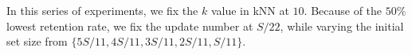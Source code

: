  In this series of experiments, we fix the $k$ value in kNN at $10$. Because of the $50\%$ lowest retention rate, we fix the update number at $S/22$, while varying the initial set size from $\{5S/11,4S/11,3S/11,2S/11, S/11\}$.

